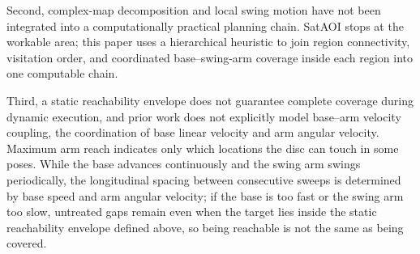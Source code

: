 Second, complex-map decomposition and local swing motion have not been integrated into a computationally practical planning chain. SatAOI stops at the workable area; this paper uses a hierarchical heuristic to join region connectivity, visitation order, and coordinated base--swing-arm coverage inside each region into one computable chain.

Third, a static reachability envelope does not guarantee complete coverage during dynamic execution, and prior work does not explicitly model base--arm velocity coupling, the coordination of base linear velocity and arm angular velocity. Maximum arm reach indicates only which locations the disc can touch in some poses. While the base advances continuously and the swing arm swings periodically, the longitudinal spacing between consecutive sweeps is determined by base speed and arm angular velocity; if the base is too fast or the swing arm too slow, untreated gaps remain even when the target lies inside the static reachability envelope defined above, so being reachable is not the same as being covered.
